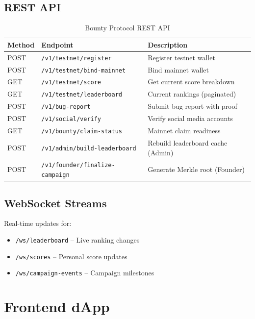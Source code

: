 \documentclass[11pt,a4paper]{article}
\begin{document}
\subsection{REST API}

\begin{table}[h]
\centering
\small
\begin{tabular}{|l|l|p{5cm}|}
\hline
\textbf{Method} & \textbf{Endpoint} & \textbf{Description} \\ \hline
POST & \texttt{/v1/testnet/register} & Register testnet wallet \\ \hline
POST & \texttt{/v1/testnet/bind-mainnet} & Bind mainnet wallet \\ \hline
GET & \texttt{/v1/testnet/score} & Get current score breakdown \\ \hline
GET & \texttt{/v1/testnet/leaderboard} & Current rankings (paginated) \\ \hline
POST & \texttt{/v1/bug-report} & Submit bug report with proof \\ \hline
POST & \texttt{/v1/social/verify} & Verify social media accounts \\ \hline
GET & \texttt{/v1/bounty/claim-status} & Mainnet claim readiness \\ \hline
POST & \texttt{/v1/admin/build-leaderboard} & Rebuild leaderboard cache (Admin) \\ \hline
POST & \texttt{/v1/founder/finalize-campaign} & Generate Merkle root (Founder) \\ \hline
\end{tabular}
\caption{Bounty Protocol REST API}
\end{table}

\subsection{WebSocket Streams}

Real-time updates for:
\begin{itemize}
    \item \texttt{/ws/leaderboard} -- Live ranking changes
    \item \texttt{/ws/scores} -- Personal score updates
    \item \texttt{/ws/campaign-events} -- Campaign milestones
\end{itemize}

\section{Frontend dApp}
\end{document}
